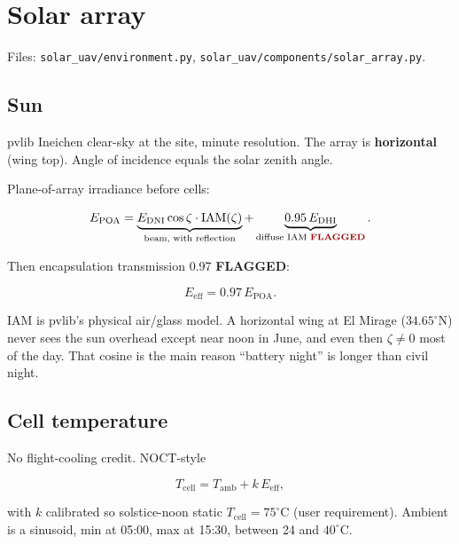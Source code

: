 \documentclass[11pt,letterpaper]{article}
\newcommand{\flag}{\textcolor{red!60!black}{\textbf{FLAGGED}}}
\newcommand{\code}[1]{\texttt{#1}}
\begin{document}
\section{Solar array}

Files: \code{solar\_uav/environment.py}, \code{solar\_uav/components/solar\_array.py}.

\subsection{Sun}

pvlib Ineichen clear-sky at the site, minute resolution. The array is \textbf{horizontal} (wing top). Angle of incidence equals the solar zenith angle.

Plane-of-array irradiance before cells:

\begin{equation}
  E_\mathrm{POA}
    = \underbrace{E_\mathrm{DNI}\cos\zeta \cdot \mathrm{IAM}(\zeta)}_{\text{beam, with reflection}}
    + \underbrace{0.95\, E_\mathrm{DHI}}_{\text{diffuse IAM \flag{}}}.
\end{equation}

Then encapsulation transmission 0.97 \flag{}:

\begin{equation}
  E_\mathrm{eff} = 0.97\, E_\mathrm{POA}.
\end{equation}

IAM is pvlib's physical air/glass model. A horizontal wing at El Mirage ($34.65^\circ\mathrm{N}$) never sees the sun overhead except near noon in June, and even then $\zeta \ne 0$ most of the day. That cosine is the main reason ``battery night'' is longer than civil night.

\subsection{Cell temperature}

No flight-cooling credit. NOCT-style

\begin{equation}
  T_\mathrm{cell} = T_\mathrm{amb} + k\, E_\mathrm{eff},
\end{equation}

with $k$ calibrated so solstice-noon static $T_\mathrm{cell} = 75^\circ\mathrm{C}$ (user requirement). Ambient is a sinusoid, min at 05:00, max at 15:30, between 24 and $40^\circ\mathrm{C}$.
\end{document}

